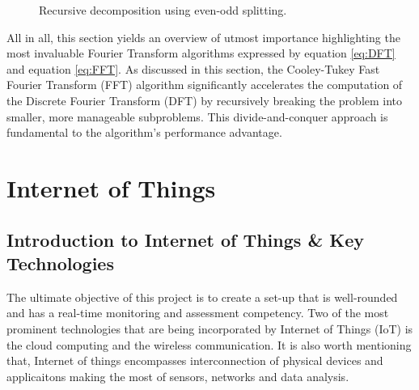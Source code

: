 {{\begin{figure}[h]
    \caption{Recursive decomposition using even-odd splitting.}
    \label{fig:RecFFT}
\end{figure}

All in all, this section yields an overview of utmost importance highlighting the most invaluable Fourier Transform algorithms expressed by equation \eqref{eq:DFT} and equation \eqref{eq:FFT}.
As discussed in this section, the Cooley-Tukey Fast Fourier Transform (FFT) algorithm significantly accelerates the computation of the Discrete Fourier Transform (DFT) by recursively breaking the problem into smaller, more manageable subproblems. This divide-and-conquer approach is fundamental to the algorithm’s performance advantage.

}



\section{Internet of Things} 
{
	\subsection{Introduction to Internet of Things \& Key Technologies}
	{
		The ultimate objective of this project is to create a set-up that is well-rounded and has a real-time monitoring and assessment competency. Two of the most prominent technologies that are being incorporated by Internet of Things (IoT) is the cloud computing and the wireless communication. It is also worth mentioning that, Internet of things encompasses interconnection of physical devices and applicaitons making the most of sensors, networks and data analysis. 
	}
	
}}
